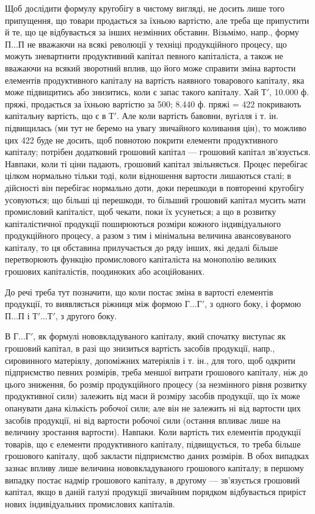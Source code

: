 Щоб дослідити формулу кругобігу в чистому вигляді, не досить лише
того припущення, що товари продається за їхньою вартістю, але треба
ще припустити й те, що це відбувається за інших незмінних обставин.
Візьмімо, напр., форму $П\dots{} П$ не вважаючи на всякі революції у техніці
продукційного процесу, що можуть зневартнити продуктивний капітал певного
капіталіста, а також не вважаючи на всякий зворотний вплив, що
його може справити зміна вартости елементів продуктивного капіталу на
вартість наявного товарового капіталу, яка може підвищитись або
знизитись, коли є запас такого капіталу. Хай $Т'$, 10.000 ф. пряжі,
продається за їхньою вартістю за 500; 8.440 ф. пряжі =
422 покривають капітальну вартість, що є в $Т'$. Але коли
вартість бавовни, вугілля і т. ін. підвищилась (ми тут не беремо на увагу
звичайного коливання цін), то можливо цих 422 буде не досить,
щоб повнотою покрити елементи продуктивного капіталу; потрібен додатковий
грошовий капітал — грошовий капітал зв’язується. Навпаки, коли
ті ціни падають, грошовий капітал звільняється. Процес перебігає цілком
нормально тільки тоді, коли відношення вартости лишаються сталі; в дійсності
він перебігає нормально доти, доки перешкоди в повторенні кругобігу
усовуються; що більші ці перешкоди, то більший грошовий капітал
мусить мати промисловий капіталіст, щоб чекати, поки їх усунеться; а що в
розвитку капіталістичної продукції поширюються розміри кожного індивідуального
продукційного процесу, а разом з тим і мінімальна величина
авансовуваного капіталу, то ця обставина прилучається до ряду
інших, які дедалі більше перетворюють функцію промислового капіталіста
на монополію великих грошових капіталістів, поодиноких або
асоційованих.

До речі треба тут позначити, що коли постає зміна в вартості елементів
продукції, то виявляється ріжниця між формою $Г\dots{} Г'$, з одного
боку, і формою $П\dots{}П$ і $Т'\dots{}Т'$, з другого боку.

В $Г\dots{} Г'$, як формулі нововкладуваного капіталу, який спочатку
виступає як грошовий капітал, в разі що знизиться вартість засобів
продукції, напр., сировинного матеріялу, допоміжних матеріялів і т. ін., для
того, щоб одкрити підприємство певних розмірів, треба меншої витрати
грошового капіталу, ніж до цього зниження, бо розмір продукційного
процесу (за незмінного рівня розвитку продуктивної сили) залежить від
маси й розміру засобів продукції, що їх може опанувати дана кількість
робочої сили; але він не залежить ні від вартости цих засобів продукції,
ні від вартости робочої сили (остання впливає лише на величину
зростання вартости). Навпаки. Коли вартість тих елементів продукції товарів,
що є елементи продуктивного капіталу, підвищується, то треба
більше грошового капіталу, щоб закласти підприємство даних розмірів.
В обох випадках зазнає впливу лише величина нововкладуваного грошового
капіталу; в першому випадку постає надмір грошового капіталу, в
другому — зв’язується грошовий капітал, якщо в даній галузі продукції
звичайним порядком відбувається приріст нових індивідуальних промислових
капіталів.

